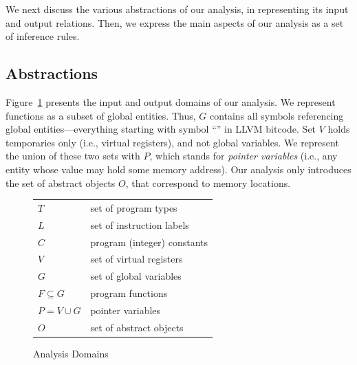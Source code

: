 We next discuss the various abstractions of our analysis, in
representing its input and output relations. Then, we express the main
aspects of our analysis as a set of inference rules.

\subsection{Abstractions}
\label{structsens/sect/abstractions}

Figure~\ref{structsens/fig/domains} presents the input and output
domains of our analysis. We represent functions as a subset of global
entities. Thus, $G$ contains all symbols referencing global
entities---everything starting with symbol ``'' in LLVM
bitcode. Set $V$ holds temporaries only (i.e., virtual registers), and
not global variables. We represent the union of these two sets with
$P$, which stands for \emph{pointer variables} (i.e., any entity whose
value may hold some memory address). Our analysis only introduces the
set of abstract objects $O$, that correspond to memory locations.

\begin{figure}[ht]
  \centering
  \begin{tabular}{l@{\quad}l}
    \toprule
    $T$ & set of program types \\
    $L$ & set of instruction labels \\
    $C$ & program (integer) constants \\
    $V$ & set of virtual registers \\
    $G$ & set of global variables \\
    $F \subseteq G$ & program functions \\
    $P = V \cup G$ & pointer variables \\
    \midrule
    $O$ & set of abstract objects \\
    \bottomrule
  \end{tabular}
  \caption{Analysis Domains}
  \label{structsens/fig/domains}
\end{figure}


